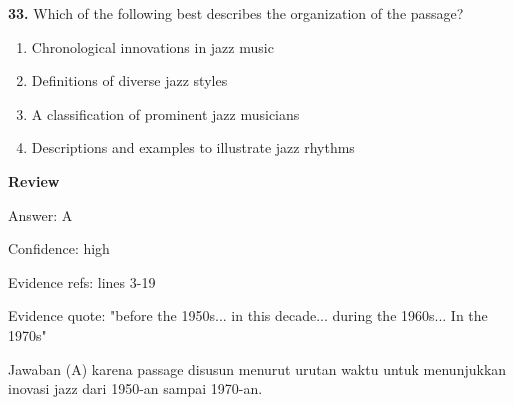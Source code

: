 \documentclass[12pt]{article}
\begin{document}
\endgroup
\par
\vspace{0.25\baselineskip}
\noindent\textbf{33.} Which of the following best describes the organization of the passage?
\begin{enumerate}[label=(\Alph*),leftmargin=*,itemsep=0.2em]
\item Chronological innovations in jazz music
\item Definitions of diverse jazz styles
\item A classification of prominent jazz musicians
\item Descriptions and examples to illustrate jazz rhythms
\end{enumerate}
\par
\begingroup
\setlength{\parskip}{0pt}
\setlength{\parindent}{0pt}
\textbf{Review}\par
Answer: A\par
Confidence: high\par
Evidence refs: lines 3-19\par
Evidence quote: "before the 1950s... in this decade... during the 1960s... In the 1970s"\par
Jawaban (A) karena passage disusun menurut urutan waktu untuk menunjukkan inovasi jazz dari 1950-an sampai 1970-an.\par
\endgroup
\par
\vspace{0.25\baselineskip}
\end{document}
